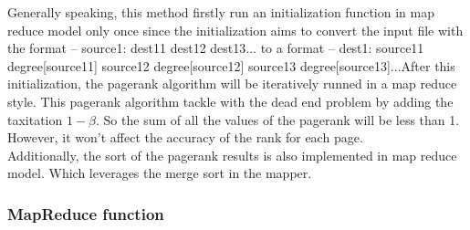 \documentclass[a4paper]{article}
\begin{document}
Generally speaking, this method firstly run an initialization function in map reduce model only once since the initialization aims to convert the input file with the format -- source1: dest11 dest12 dest13... to a format -- dest1: source11 degree[source11] source12 degree[source12] source13 degree[source13]...After this initialization, the pagerank algorithm will be iteratively runned in a map reduce style. This pagerank algorithm tackle with the dead end problem by adding the taxitation $1-\beta$. So the sum of all the values of the pagerank will be less than 1. However, it won't affect the accuracy of the rank for each page.\\

Additionally, the sort of the pagerank results is also implemented in map reduce model. Which leverages the merge sort in the mapper.
\subsubsection{MapReduce function}
\end{document}
